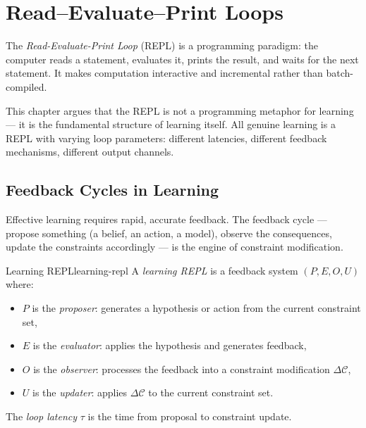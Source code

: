 \chapter{Read–Evaluate–Print Loops}



The \emph{Read-Evaluate-Print Loop} (REPL) is a programming paradigm:
the computer reads a statement, evaluates it, prints the result, and
waits for the next statement. It makes computation interactive and
incremental rather than batch-compiled.

This chapter argues that the REPL is not a programming metaphor for
learning — it is the fundamental structure of learning itself. All
genuine learning is a REPL with varying loop parameters: different
latencies, different feedback mechanisms, different output channels.

\section{Feedback Cycles in Learning}

Effective learning requires rapid, accurate feedback. The feedback
cycle — propose something (a belief, an action, a model), observe
the consequences, update the constraints accordingly — is the
engine of constraint modification.

\begin{definition}{Learning REPL}{learning-repl}
  A \emph{learning REPL} is a feedback system $(P, E, O, U)$ where:
  \begin{itemize}
    \item $P$ is the \emph{proposer}: generates a hypothesis or action
          from the current constraint set,
    \item $E$ is the \emph{evaluator}: applies the hypothesis and
          generates feedback,
    \item $O$ is the \emph{observer}: processes the feedback into
          a constraint modification $\Delta\mathcal{C}$,
    \item $U$ is the \emph{updater}: applies $\Delta\mathcal{C}$
          to the current constraint set.
  \end{itemize}
  The \emph{loop latency} $\tau$ is the time from proposal to
  constraint update.
\end{definition}

